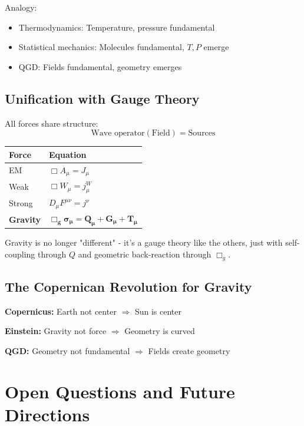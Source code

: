 \documentclass[11pt,a4paper]{article}
\theoremstyle{definition}
\theoremstyle{remark}
\begin{document}
		Analogy:
		\begin{itemize}
			\item Thermodynamics: Temperature, pressure fundamental
			\item Statistical mechanics: Molecules fundamental, $T, P$ emerge
			\item QGD: Fields fundamental, geometry emerges
		\end{itemize}
		
		\subsection{Unification with Gauge Theory}
		
		All forces share structure:
		\begin{equation}
			\text{Wave operator}(\text{Field}) = \text{Sources}
		\end{equation}
		
		\begin{center}
			\begin{tabular}{@{}ll@{}}
				\toprule
				\textbf{Force} & \textbf{Equation}\\
				\midrule
				EM & $\Box A_\mu = J_\mu$\\
				Weak & $\Box W_\mu = j_\mu^W$\\
				Strong & $D_\mu F^{\mu\nu} = j^\nu$\\
				\textbf{Gravity} & $\boldsymbol{\Box_g\sigma_\mu = Q_\mu + G_\mu + T_\mu}$\\
				\bottomrule
			\end{tabular}
		\end{center}
		
		Gravity is no longer "different" - it's a gauge theory like the others, just with self-coupling through $Q$ and geometric back-reaction through $\Box_g$.
		
		\subsection{The Copernican Revolution for Gravity}
		
		\textbf{Copernicus:} Earth not center $\Rightarrow$ Sun is center
		
		\textbf{Einstein:} Gravity not force $\Rightarrow$ Geometry is curved
		
		\textbf{QGD:} Geometry not fundamental $\Rightarrow$ Fields create geometry
		
		\section{Open Questions and Future Directions}
		
\end{document}
